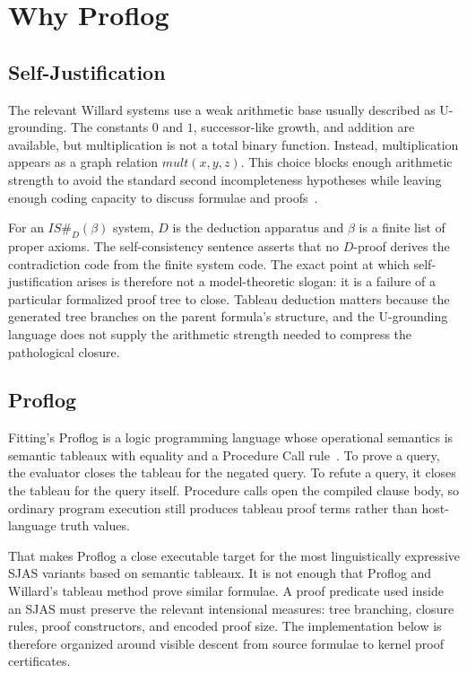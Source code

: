 \documentclass[runningheads]{llncs}
\begin{document}
\section{Why Proflog}

\subsection{Self-Justification}

The relevant Willard systems use a weak arithmetic base usually described as
U-grounding.  The constants \(0\) and \(1\), successor-like growth, and addition
are available, but multiplication is not a total binary function.  Instead,
multiplication appears as a graph relation \(\mathit{mult}(x,y,z)\).  This
choice blocks enough arithmetic strength to avoid the standard second
incompleteness hypotheses while leaving enough coding capacity to discuss
formulae and proofs~\cite{willard2004addition,willard2013significance}.

For an \(IS\#_D(\beta)\) system, \(D\) is the deduction apparatus and
\(\beta\) is a finite list of proper axioms.  The self-consistency sentence
asserts that no \(D\)-proof derives the contradiction code from the finite
system code.  The exact point at which self-justification arises is therefore
not a model-theoretic slogan: it is a failure of a particular formalized proof
tree to close.  Tableau deduction matters because the generated tree branches
on the parent formula's structure, and the U-grounding language does not supply
the arithmetic strength needed to compress the pathological closure.

\subsection{Proflog}

Fitting's Proflog is a logic programming language whose operational semantics
is semantic tableaux with equality and a Procedure Call rule~\cite{fitting1994tableaux}.
To prove a query, the evaluator closes the tableau for the negated query.  To
refute a query, it closes the tableau for the query itself.  Procedure calls
open the compiled clause body, so ordinary program execution still produces
tableau proof terms rather than host-language truth values.

That makes Proflog a close executable target for the most linguistically
expressive SJAS variants based on semantic tableaux.  It is not enough that
Proflog and Willard's tableau method prove similar formulae.  A proof predicate
used inside an SJAS must preserve the relevant intensional measures: tree
branching, closure rules, proof constructors, and encoded proof size.  The
implementation below is therefore organized around visible descent from source
formulae to kernel proof certificates.
\end{document}
